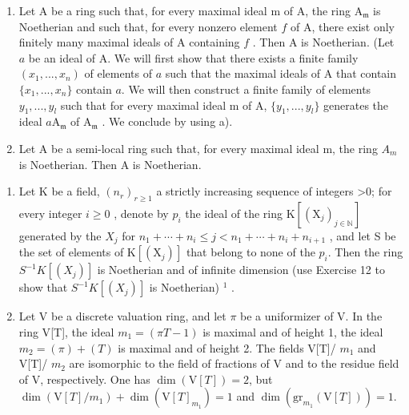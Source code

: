 \begin{enumerate}
\def\labelenumi{\alph{enumi})}
\setcounter{enumi}{1}
\item
  Let A be a ring such that, for every maximal ideal m of A, the ring \(\mathrm{A}_{\mathfrak{m}}\) is Noetherian and such that, for every nonzero element \(f\) of A, there exist only finitely many maximal ideals of A containing \(f\) . Then A is Noetherian. (Let \(a\) be an ideal of A. We will first show that there exists a finite family \((x_1, ..., x_n)\) of elements of \(a\) such that the maximal ideals of A that contain \(\{x_1, ..., x_n\}\) contain \(a\). We will then construct a finite family of elements \(y_1, ..., y_l\) such that for every maximal ideal m of A, \(\{y_1, ..., y_l\}\) generates the ideal \(a\mathrm{A}_{\mathfrak{m}}\) of \(\mathrm{A}_{\mathfrak{m}}\) . We conclude by using a).
\item
  Let A be a semi-local ring such that, for every maximal ideal m, the ring \(A_{m}\) is Noetherian. Then A is Noetherian.
\end{enumerate}

\begin{enumerate}
\def\labelenumi{\arabic{enumi})}
\setcounter{enumi}{12}
\item
  Let K be a field, \((n_{r})_{r\geqslant1}\) a strictly increasing sequence of integers \textgreater0; for every integer \(i\geqslant0\) , denote by \(p_{i}\) the ideal of the ring \(\mathrm{K}[(\mathrm{X}_{j})_{j\in\mathbb{N}}]\) generated by the \(X_{j}\) for \(n_{1}+\cdots+n_{i}\leqslant j<n_{1}+\cdots+n_{i}+n_{i+1}\) , and let S be the set of elements of \(\mathrm{K}[(\mathrm{X}_{j})]\) that belong to none of the \(p_{i}\). Then the ring \(S^{-1}K[(X_{j})]\) is Noetherian and of infinite dimension (use Exercise 12 to show that \(S^{-1}K[(X_{j})]\) is Noetherian) \(^{1}\) .
\item
  Let V be a discrete valuation ring, and let \(\pi\) be a uniformizer of V. In the ring V{[}T{]}, the ideal \(m_1 = (\pi T - 1)\) is maximal and of height 1, the ideal \(m_2 = (\pi) + (T)\) is maximal and of height 2. The fields V{[}T{]}/ \(m_1\) and V{[}T{]}/ \(m_2\) are isomorphic to the field of fractions of V and to the residue field of V, respectively. One has \(\dim(\mathrm{V}[T]) = 2\), but \(\dim(\mathrm{V}[T]/m_1) + \dim(\mathrm{V}[T]_{m_1}) = 1\) and \(\dim(\mathrm{gr}_{m_1}(\mathrm{V}[T])) = 1\).
\end{enumerate}


